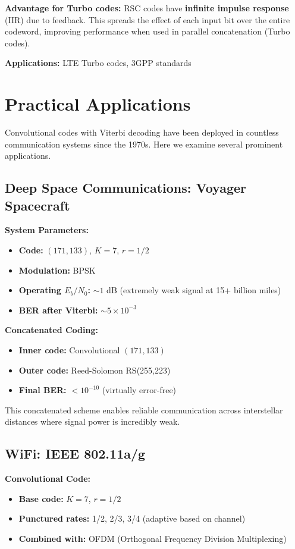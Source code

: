 \textbf{Advantage for Turbo codes:} RSC codes have \textbf{infinite impulse response} (IIR) due to feedback. This spreads the effect of each input bit over the entire codeword, improving performance when used in parallel concatenation (Turbo codes).

\textbf{Applications:} LTE Turbo codes, 3GPP standards

\section{Practical Applications}

Convolutional codes with Viterbi decoding have been deployed in countless communication systems since the 1970s. Here we examine several prominent applications.

\subsection{Deep Space Communications: Voyager Spacecraft}

\textbf{System Parameters:}
\begin{itemize}
\item \textbf{Code:} $(171, 133)$, $K=7$, $r=1/2$
\item \textbf{Modulation:} BPSK
\item \textbf{Operating $E_b/N_0$:} $\sim 1$ dB (extremely weak signal at 15+ billion miles)
\item \textbf{BER after Viterbi:} $\sim 5 \times 10^{-3}$
\end{itemize}

\textbf{Concatenated Coding:}
\begin{itemize}
\item \textbf{Inner code:} Convolutional $(171, 133)$
\item \textbf{Outer code:} Reed-Solomon RS(255,223)
\item \textbf{Final BER:} $< 10^{-10}$ (virtually error-free)
\end{itemize}

This concatenated scheme enables reliable communication across interstellar distances where signal power is incredibly weak.

\subsection{WiFi: IEEE 802.11a/g}

\textbf{Convolutional Code:}
\begin{itemize}
\item \textbf{Base code:} $K=7$, $r=1/2$
\item \textbf{Punctured rates:} 1/2, 2/3, 3/4 (adaptive based on channel)
\item \textbf{Combined with:} OFDM (Orthogonal Frequency Division Multiplexing)
\end{itemize}

